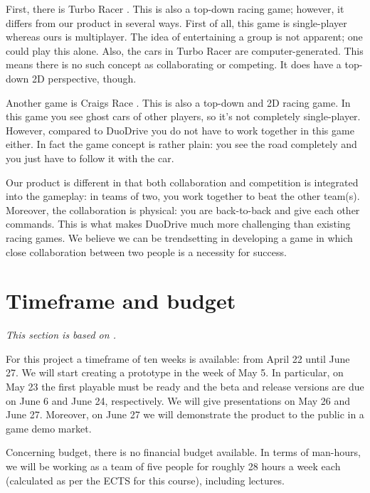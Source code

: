 \documentclass[11pt,twoside,a4paper]{article}
\begin{document}
First, there is Turbo Racer \cite{turboracer}. This is also a top-down racing game; however, it differs from our product in several ways. First of all, this game is single-player whereas ours is multiplayer. The idea of entertaining a group is not apparent; one could play this alone. Also, the cars in Turbo Racer are computer-generated. This means there is no such concept as collaborating or competing. It does have a top-down 2D perspective, though.

Another game is Craigs Race \cite{craigsrace1} \cite{craigsrace2}. This is also a top-down and 2D racing game. In this game you see ghost cars of other players, so it's not completely single-player. However, compared to DuoDrive you do not have to work together in this game either. In fact the game concept is rather plain: you see the road completely and you just have to follow it with the car.

Our product is different in that both collaboration and competition is integrated into the gameplay: in teams of two, you work together to beat the other team(s). Moreover, the collaboration is physical: you are back-to-back and give each other commands. This is what makes DuoDrive much more challenging than existing racing games. We believe we can be trendsetting in developing a game in which close collaboration between two people is a necessity for success.


\section{Timeframe and budget}
{\itshape This section is based on \cite{gamesplanning}.}

For this project a timeframe of ten weeks is available: from April 22 until June 27. We will start creating a prototype in the week of May 5. In particular, on May 23 the first playable must be ready and the beta and release versions are due on June 6 and June 24, respectively. We will give presentations on May 26 and June 27. Moreover, on June 27 we will demonstrate the product to the public in a game demo market.

Concerning budget, there is no financial budget available. In terms of man-hours, we will be working as a team of five people for roughly 28 hours a week each (calculated as per the ECTS for this course), including lectures.
\end{document}
